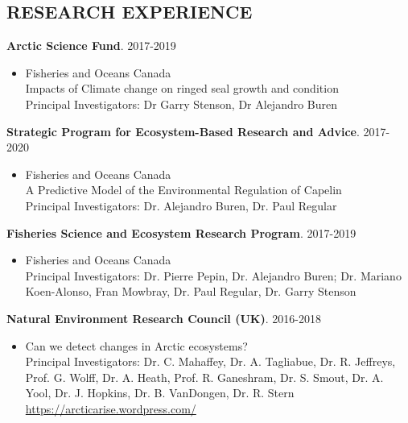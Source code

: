 \documentclass{res}
\begin{document}
\begin{resume}
\section{RESEARCH EXPERIENCE}
\vspace{0.1in}
{\bf Arctic Science Fund}. 2017-2019
\begin{itemize} %
	\item[] Fisheries and Oceans Canada\\
	Impacts of Climate change on ringed seal growth and condition\\
	Principal Investigators: Dr Garry Stenson, Dr Alejandro Buren
\end{itemize}
{\bf Strategic Program for Ecosystem-Based Research and Advice}. 2017-2020
\begin{itemize} %
	\item[] Fisheries and Oceans Canada\\
	A Predictive Model of the Environmental Regulation of Capelin\\
	Principal Investigators: Dr. Alejandro Buren, Dr. Paul Regular
\end{itemize}

\textbf{Fisheries Science and Ecosystem Research Program}. 2017-2019
\begin{itemize} %
	\item[] Fisheries and Oceans Canada\\
Principal Investigators: Dr. Pierre Pepin, Dr. Alejandro Buren; Dr. Mariano Koen-Alonso, Fran Mowbray, Dr. Paul Regular, Dr. Garry Stenson
\end{itemize}

\textbf{Natural Environment Research Council (UK)}. 2016-2018
\begin{itemize} %
	\item[] Can we detect changes in Arctic ecosystems?\\
Principal Investigators: Dr. C. Mahaffey, Dr. A. Tagliabue, Dr. R. Jeffreys, Prof. G. Wolff, Dr. A. Heath, Prof. R. Ganeshram, Dr. S. Smout, Dr. A. Yool, Dr. J. Hopkins, Dr. B. VanDongen, Dr. R. Stern \\
\url{https://arcticarise.wordpress.com/}
\end{itemize}


\end{resume}
\end{document}
